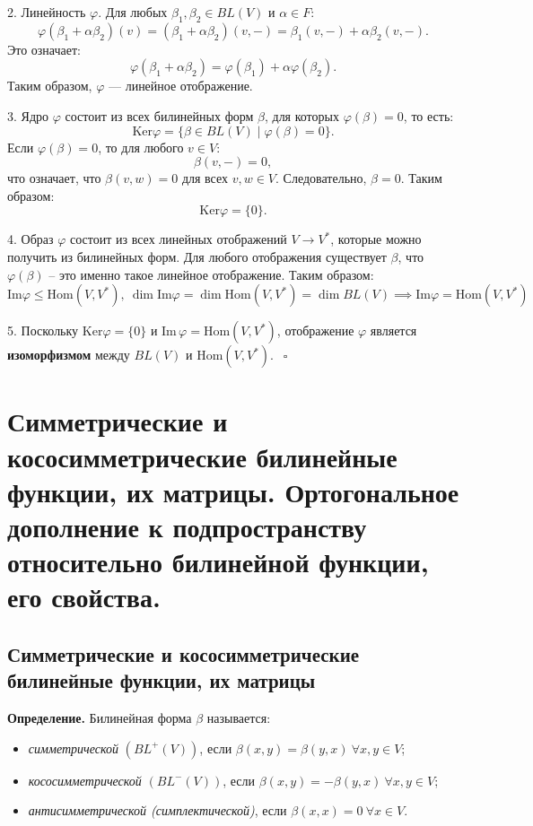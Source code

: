 \documentclass[12pt]{article}
\begin{document}
2. Линейность $\varphi$. Для любых $\beta_1, \beta_2 \in BL(V)$ и $\alpha \in F$:
       $$
       \varphi(\beta_1 + \alpha \beta_2)(v) = (\beta_1 + \alpha \beta_2)(v, -) = \beta_1(v, -) + \alpha \beta_2(v, -).
       $$
       Это означает:
       $$
       \varphi(\beta_1 + \alpha \beta_2) = \varphi(\beta_1) + \alpha \varphi(\beta_2).
       $$
       Таким образом, $\varphi$ — линейное отображение.

3. Ядро $\varphi$ состоит из всех билинейных форм $\beta$, для которых $\varphi(\beta) = 0$, то есть:
     $$
     \mathrm{Ker} \varphi = \{\beta \in BL(V) \mid \varphi(\beta) = 0\}.
     $$
     Если $\varphi(\beta) = 0$, то для любого $v \in V$:
     $$
     \beta(v, -) = 0,
     $$
     что означает, что $\beta(v, w) = 0$ для всех $v, w \in V$. Следовательно, $\beta = 0$. Таким образом:
     $$
     \mathrm{Ker} \varphi = \{0\}.
     $$

4. Образ $\varphi$ состоит из всех линейных отображений $V \to V^*$, которые можно получить из билинейных форм. Для любого отображения существует $\beta$, что $\varphi(\beta)$ – это именно такое линейное отображение. Таким образом:
     $$
     \mathrm{Im} \varphi \leq \mathrm{Hom}(V, V^*), \ \dim \mathrm{Im}\varphi=\dim \mathrm{Hom}(V,V^*)=\dim BL(V) \implies \mathrm{Im}\varphi = \mathrm{Hom}(V,V^*)
     $$

5. Поскольку $\mathrm{Ker} \varphi = \{0\}$ и $\mathrm{Im} \, \varphi = \mathrm{Hom}(V, V^*)$, отображение $\varphi$ является \textbf{изоморфизмом} между $BL(V)$ и $\mathrm{Hom}(V, V^*)$. $\ \ \square$



\section{Симметрические и кососимметрические билинейные функции, их матрицы. Ортогональное дополнение к подпространству относительно билинейной функции, его свойства.}

\subsection{Симметрические и кососимметрические билинейные функции, их матрицы}

\textbf{Определение.} Билинейная форма $\beta$ называется:
\begin{itemize}
    \item \textit{симметрической} $(BL^+(V))$, если $\beta(x, y) = \beta(y, x) \ \forall x, y \in V$;
    \item \textit{кососимметрической} $(BL^-(V))$, если $\beta(x, y) = -\beta(y, x) \ \forall x, y \in V$;
    \item \textit{антисимметрической (симплектической)}, если $\beta(x,x)=0 \ \forall x \in V$.
\end{itemize}
\end{document}
